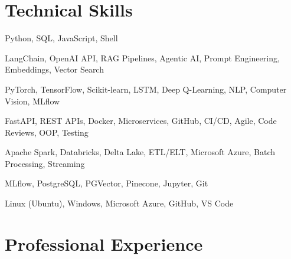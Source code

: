 \documentclass[11pt,a4paper,sans]{moderncv}
\begin{document}

\section{Technical Skills}

{Python, SQL, JavaScript, Shell}

{LangChain, OpenAI API, RAG Pipelines, Agentic AI, Prompt Engineering,
Embeddings, Vector Search}

{PyTorch, TensorFlow, Scikit-learn, LSTM, Deep Q-Learning,
NLP, Computer Vision, MLflow}

{FastAPI, REST APIs, Docker, Microservices, GitHub, CI/CD,
Agile, Code Reviews, OOP, Testing}

{Apache Spark, Databricks, Delta Lake, ETL/ELT,
Microsoft Azure, Batch Processing, Streaming}

{MLflow, PostgreSQL, PGVector, Pinecone, Jupyter, Git}

{Linux (Ubuntu), Windows, Microsoft Azure, GitHub, VS Code}


\section{Professional Experience}
\end{document}
